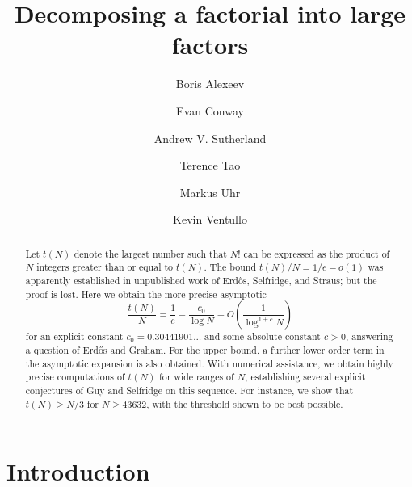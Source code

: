 \documentclass[12pt,a4paper,reqno]{amsart}
\numberwithin{equation}{section}
\theoremstyle{plain}
\theoremstyle{definition}
\begin{document}
\title{Decomposing a factorial into large factors}

\author[Alexeev]{Boris Alexeev}
\address{Unaffiliated, Athens, GA 30605}

\author[Conway]{Evan Conway}
\address{UVA Department of Mathematics, Charlottesville, VA 22903}

\author[Sutherland]{Andrew V. Sutherland}
\address{MIT Department of Mathematics, Cambridge, MA 02139.}

\author[Tao]{Terence Tao}
\address{UCLA Department of Mathematics, Los Angeles, CA 90095-1555.}

\author[Uhr]{Markus Uhr}
\address{???}

\author[Ventullo]{Kevin Ventullo}
\address{Google, Mountain View, CA}



\begin{abstract}  Let $t(N)$ denote the largest number such that $N!$ can be expressed as the product of $N$ integers greater than or equal to $t(N)$.
The bound $t(N)/N = 1/e-o(1)$ was apparently established in unpublished work of Erd\H{o}s, Selfridge, and Straus; but the proof is lost.  Here we obtain the more precise asymptotic 
$$ \frac{t(N)}{N} = \frac{1}{e} - \frac{c_0}{\log N} + O\left( \frac{1}{\log^{1+c} N} \right)$$
for an explicit constant $c_0 = 0.30441901\dots$ and some absolute constant $c>0$, answering a question of Erd\H{o}s and Graham.  For the upper bound, a further lower order term in the asymptotic expansion is also obtained.  With numerical assistance, we obtain highly precise computations of $t(N)$ for wide ranges of $N$, establishing several explicit conjectures of Guy and Selfridge on this sequence.  For instance, we show that $t(N) \geq N/3$ for $N \geq 43632$, with the threshold shown to be best possible. 
\end{abstract}


\maketitle


\section{Introduction}
\end{document}
